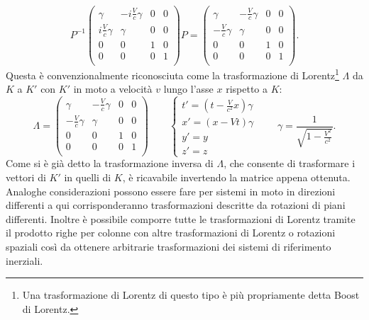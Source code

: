  \begin{equation*}
    P^{-1}\begin{pmatrix}
        \gamma & -i\frac{V}{c}\gamma & 0 & 0\\
        i\frac{V}{c}\gamma & \gamma & 0 & 0\\
        0& 0 & 1 & 0\\
        0& 0 & 0 & 1\\
       \end{pmatrix}
       P=\begin{pmatrix}
        \gamma & -\frac{V}{c}\gamma & 0 & 0\\
        -\frac{V}{c}\gamma & \gamma & 0 & 0\\
        0& 0 & 1 & 0\\
        0& 0 & 0 & 1\\
       \end{pmatrix}.
 \end{equation*}
 Questa è convenzionalmente riconosciuta come la trasformazione di Lorentz\footnote{Una trasformazione di Lorentz di questo tipo è più propriamente detta Boost di Lorentz.} $\Lambda$ da $K$ a $K'$ con $K'$ in moto a velocità $v$ lungo l'asse $x$ rispetto a $K$:
 \begin{equation}
    \Lambda=
    \begin{pmatrix}
        \gamma & -\frac{V}{c}\gamma & 0 & 0\\
        -\frac{V}{c}\gamma & \gamma & 0 & 0\\
        0& 0 & 1 & 0\\
        0& 0 & 0 & 1\\
       \end{pmatrix}
       \qquad
       \begin{cases}
        t'=(t-\frac{V}{c^2}x)\gamma\\
        x'=(x-Vt)\gamma\\
        y'=y\\
        z'=z
       \end{cases}
       \qquad \gamma=\frac{1}{\sqrt{1-\frac{V^2}{c^2}}}.
       \label{TrasformazioneLorentz}
 \end{equation}
Come si è già detto la trasformazione inversa di $\Lambda$, che consente di trasformare i vettori di $K'$ in quelli di $K$, è ricavabile invertendo la matrice appena ottenuta.\\

Analoghe considerazioni possono essere fare per sistemi in moto in direzioni differenti a qui corrisponderanno trasformazioni descritte da rotazioni di piani differenti. Inoltre è possibile comporre tutte le trasformazioni di Lorentz tramite il prodotto righe per colonne con altre trasformazioni di Lorentz o rotazioni spaziali così da ottenere arbitrarie trasformazioni dei sistemi di riferimento inerziali.\\


